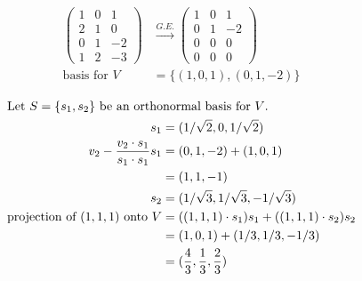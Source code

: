 \documentclass[12pt]{article}
\newenvironment{problem}[2][Problem]{\begin{trivlist}
\item[\hskip \labelsep {\bfseries #1}\hskip \labelsep {\bfseries #2.}]}{\end{trivlist}}
\begin{document}
\begin{problem}{3.a}
\end{problem}
\begin{align*}
\left( \begin{array}{ccc}
1 & 0 & 1 \\
2 & 1 & 0 \\
0 & 1 & -2 \\
1 & 2 & -3 
\end{array} \right)
&\xrightarrow{G.E.}
\left( \begin{array}{ccc}
1 & 0 & 1 \\
0 & 1 & -2 \\
0 & 0 & 0 \\
0 & 0 & 0 
\end{array} \right)\\
\text{basis for $V$} & = \{(1, 0, 1), (0, 1, -2)\}
\end{align*}

\begin{problem}{3.b.i}
\end{problem}
\begin{align*}
\intertext{Let $S = \{s_1, s_2\}$ be an orthonormal basis for $V$.}
s_1 &= (1/\sqrt{2}, 0 ,1/\sqrt{2})\\
v_2 - \frac{v_2 \cdot s_1} {s_1 \cdot s_1} s_1 &= (0, 1, -2) + (1, 0, 1)\\
&= (1, 1, -1)\\
s_2 &= (1/\sqrt{3}, 1/\sqrt{3}, -1/\sqrt{3})\\
\text{projection of $(1, 1, 1)$ onto $V$} &= ((1,1,1) \cdot s_1)s_1 + ((1,1,1) \cdot s_2)s_2\\
&= (1, 0, 1) + (1/3, 1/3, -1/3)\\
&= (\frac{4}{3}, \frac{1}{3}, \frac{2}{3})
\end{align*}
\end{document}
